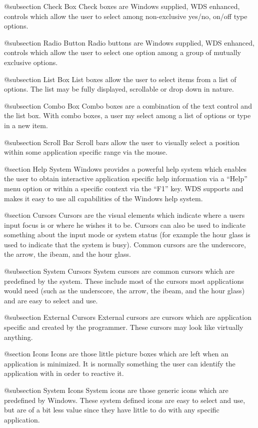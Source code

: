 @subsection Check Box
Check boxes are Windows supplied, WDS enhanced, controls which allow
the user to select among non-exclusive yes/no, on/off type options.

@subsection Radio Button
Radio buttons are Windows supplied, WDS enhanced, controls which allow
the user to select one option among a group of mutually exclusive options.

@subsection List Box
List boxes allow the user to select items from a list of options.  The
list may be fully displayed, scrollable or drop down in nature.

@subsection Combo Box
Combo boxes are a combination of the text control and the list box.
With combo boxes, a user my select among a list of options or type
in a new item.

@subsection Scroll Bar
Scroll bars allow the user to visually select a position within some
application specific range via the mouse.

@section Help System
Windows provides a powerful help system which enables the user to obtain
interactive application specific help information via a ``Help'' menu
option or within a specific context via the ``F1'' key.  WDS supports
and makes it easy to use all capabilities of the Windows help system.

@section Cursors
Cursors are the visual elements which indicate where a users input focus
is or where he wishes it to be.  Cursors can also be used to indicate
something about the input mode or system status (for example the hour
glass is used to indicate that the system is busy).  Common cursors are
the underscore, the arrow, the ibeam, and the hour glass.

@subsection System Cursors
System cursors are common cursors which are predefined by the system.
These include most of the cursors most applications would need (such as
the underscore, the arrow, the ibeam, and the hour glass) and are easy to
select and use.

@subsection External Cursors
External cursors are cursors which are application specific and
created by the programmer.  These cursors may look like virtually
anything.

@section Icons
Icons are those little picture boxes which are left when an application
is minimized.  It is normally something the user can identify the
application with in order to reactive it.

@subsection System Icons
System icons are those generic icons which are predefined by Windows.
These system defined icons are easy to select and use, but are of a bit
less value since they have little to do with any specific application.

